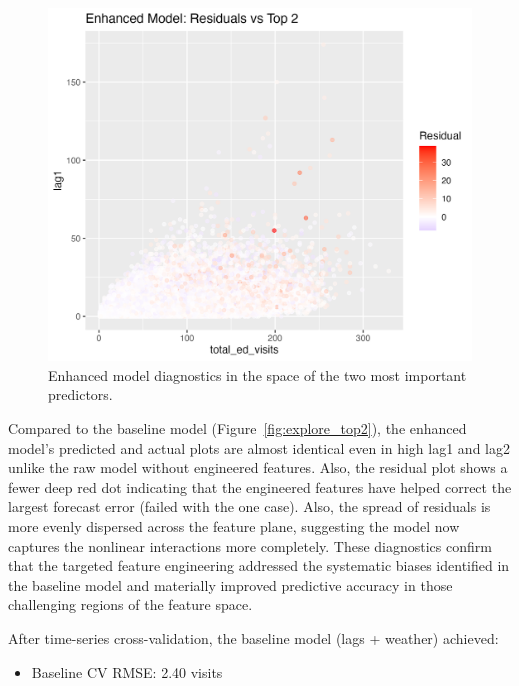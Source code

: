 \documentclass[11pt]{article}
\begin{document}
\begin{figure}[H]
\begin{minipage}[b]{0.32\textwidth}
  \end{minipage}\hfill
  \begin{minipage}[b]{0.32\textwidth}
    \centering
    \includegraphics[width=\textwidth]{plot_residuals_vs_top2_enhanced.png}
  \end{minipage}
  \caption{Enhanced model diagnostics in the space of the two most important predictors.}
  \label{fig:enhanced_top2}
\end{figure}

Compared to the baseline model (Figure~\ref{fig:explore_top2}), the enhanced model’s predicted and actual plots are almost identical even in high lag1 and lag2 unlike the raw model without engineered features.
Also, the residual plot shows a fewer deep red dot indicating that the engineered features have helped correct the largest forecast error (failed with the one case). Also, the spread of residuals is more evenly dispersed across the feature plane, suggesting the model now captures the nonlinear interactions more completely. These diagnostics confirm that the targeted feature engineering addressed the systematic biases identified in the baseline model and materially improved predictive accuracy in those challenging regions of the feature space.  

After time-series cross-validation, the baseline model (lags + weather) achieved:
\begin{itemize}[nosep]
  \item Baseline CV RMSE: 2.40 visits
\end{itemize}
\end{document}
